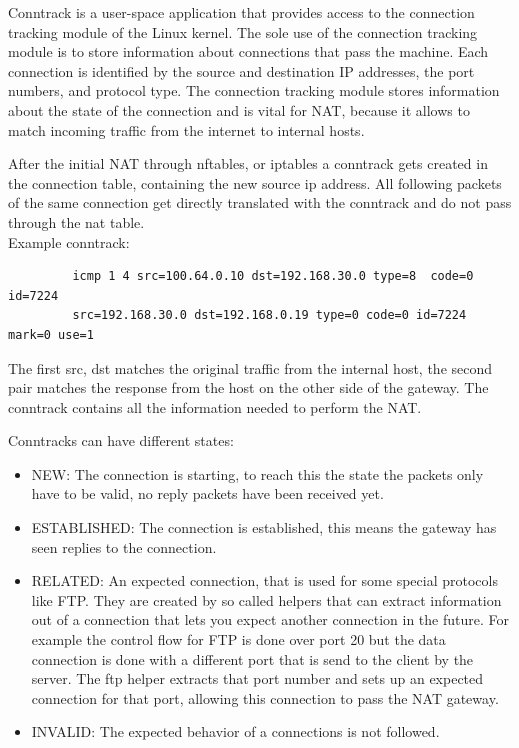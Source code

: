 \documentclass{report}
\begin{document}
Conntrack\cite{conntrack-tools} is a user-space application that provides access to the
connection tracking module\cite{conntrackSys} of the Linux kernel. The sole use of the
connection tracking module is to store information about connections
that pass the machine. Each connection is identified by the source and
destination IP addresses, the port numbers, and protocol type. The
connection tracking module stores information about the state of the
connection and is vital for NAT, because it allows to match incoming
traffic from the internet to internal hosts.

After the initial NAT through nftables, or iptables a conntrack gets
created in the connection table, containing the new source ip address.
All following packets of the same connection get directly translated
with the conntrack and do not pass through the nat table. \\

Example conntrack:


\begin{verbatim}
         icmp 1 4 src=100.64.0.10 dst=192.168.30.0 type=8  code=0 id=7224
         src=192.168.30.0 dst=192.168.0.19 type=0 code=0 id=7224 mark=0 use=1
\end{verbatim}

The first src, dst matches the original traffic from the internal host,
the second pair matches the response from the host on the other side of
the gateway. The conntrack contains all the information needed to
perform the NAT.

Conntracks can have different states:

\begin{itemize}
\item
  NEW: The connection is starting, to reach this the state the packets
  only have to be valid, no reply packets have been received yet.
\item
  ESTABLISHED: The connection is established, this means the gateway has
  seen replies to the connection.
\item
  RELATED: An expected connection, that is used for some special
  protocols like FTP. They are created by so called helpers that can
  extract information out of a connection that lets you expect another
  connection in the future. For example the control flow for FTP is done
  over port 20 but the data connection is done with a different port
  that is send to the client by the server. The ftp helper extracts that
  port number and sets up an expected connection for that port, allowing
  this connection to pass the NAT gateway.
\item
  INVALID: The expected behavior of a connections is not followed.
\end{itemize}
\end{document}
